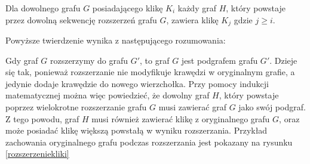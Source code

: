 \begin{theorem}
	Dla dowolnego grafu $G$ posiadającego klikę $K_i$ każdy graf $H$, który powstaje przez dowolną sekwencję rozszerzeń grafu $G$, zawiera klikę $K_j$ gdzie $j \geq i$.
\label{tw5}
\end{theorem}


Powyższe twierdzenie wynika z  następującego rozumowania:

 Gdy graf $G$ rozszerzymy do grafu $G'$, to graf $G$ jest podgrafem grafu $G'$. Dzieje się tak, ponieważ rozszerzanie nie modyfikuje krawędzi w oryginalnym grafie, a jedynie dodaje krawędzie do nowego wierzchołka. Przy pomocy indukcji matematycznej można więc powiedzieć, że dowolny graf $H$, który powstaje poprzez wielokrotne rozszerzanie grafu $G$ musi zawierać graf $G$ jako swój podgraf. Z tego powodu, graf $H$ musi również zawierać klikę z oryginalnego grafu $G$, oraz może posiadać klikę większą powstałą w wyniku rozszerzania. Przykład zachowania oryginalnego grafu podczas rozszerzania jest pokazany na rysunku \ref{rozszerzeniekliki}

